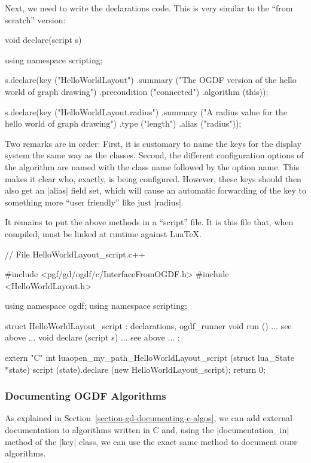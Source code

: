 Next, we need to write the declarations code. This is very similar to the
``from scratch'' version:
%
\begin{codeexample}[code only, tikz syntax=false]
void declare(script s) {
  using namespace scripting;

  s.declare(key ("HelloWorldLayout")
            .summary ("The OGDF version of the hello world of graph drawing")
            .precondition ("connected")
            .algorithm (this));

  s.declare(key ("HelloWorldLayout.radius")
            .summary ("A radius value for the hello world of graph drawing")
            .type ("length")
            .alias ("radius"));
}
\end{codeexample}

Two remarks are in order: First, it is customary to name the keys for the
display system the same way as the classes. Second, the different configuration
options of the algorithm are named with the class name followed by the option
name. This makes it clear who, exactly, is being configured. However, these
keys should then also get an |alias| field set, which will cause an automatic
forwarding of the key to something more ``user friendly'' like just |radius|.

It remains to put the above methods in a ``script'' file. It is this file that,
when compiled, must be linked at runtime against Lua\TeX.
%
\begin{codeexample}[code only, tikz syntax=false]
// File HelloWorldLayout_script.c++

#include <pgf/gd/ogdf/c/InterfaceFromOGDF.h>
#include <HelloWorldLayout.h>

using namespace ogdf;
using namespace scripting;

struct HelloWorldLayout_script : declarations, ogdf_runner {
  void run ()             { ... see above ... }
  void declare (script s) { ... see above ... }
};

extern "C" int luaopen_my_path_HelloWorldLayout_script (struct lua_State *state) {
  script (state).declare (new HelloWorldLayout_script);
  return 0;
}
\end{codeexample}


\subsubsection{Documenting OGDF Algorithms}

As explained in Section~\ref{section-gd-documenting-c-algos}, we can add
external documentation to algorithms written in C and, using the
|documentation_in| method of the |key| class, we can use the exact same method
to document \textsc{ogdf} algorithms.

